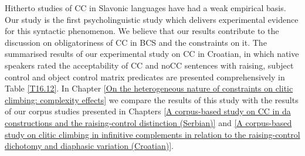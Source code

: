 Hitherto studies of CC in Slavonic languages have had a weak empirical basis. Our study is the first psycholinguistic study which delivers experimental evidence for this syntactic phenomenon. We believe that our results contribute to the discussion on obligatoriness of CC in BCS and the constraints on it. The summarised results of our experimental study on CC in Croatian, in which native speakers rated the acceptability of CC and noCC sentences with raising, subject control and object control matrix predicates are presented comprehensively in Table \ref{T16.12}. In Chapter \ref{On the heterogeneous nature of constraints on clitic climbing: complexity effects} we compare the results of this study with the results of our corpus studies presented in Chapters \ref{A corpus-based study on CC in da constructions and the raising-control distinction (Serbian)} and \ref{A corpus-based study on clitic climbing in infinitive complements in relation to the raising-control dichotomy and diaphasic variation (Croatian)}.


